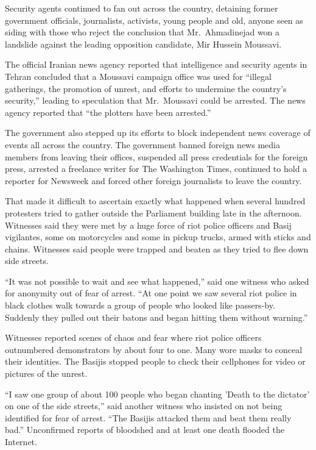 ﻿\documentclass[12pt]{article}
\begin{document}
Security agents continued to fan out across the country, detaining former government officials,
journalists, activists, young people and old, anyone seen as siding with those who reject the
conclusion that Mr.~Ahmadinejad won a landslide against the leading opposition candidate, Mir
Hussein Moussavi.

The official Iranian news agency reported that intelligence and security agents in Tehran concluded
that a Moussavi campaign office was used for ``illegal gatherings, the promotion of unrest, and
efforts to undermine the country's security,'' leading to speculation that Mr.~Moussavi could be
arrested. The news agency reported that ``the plotters have been arrested.''

The government also stepped up its efforts to block independent news coverage of events all across
the country. The government banned foreign news media members from leaving their offices, suspended
all press credentials for the foreign press, arrested a freelance writer for The Washington Times,
continued to hold a reporter for Newsweek and forced other foreign journalists to leave the country.

That made it difficult to ascertain exactly what happened when several hundred protesters tried to
gather outside the Parliament building late in the afternoon. Witnesses said they were met by a huge
force of riot police officers and Basij vigilantes, some on motorcycles and some in pickup trucks,
armed with sticks and chains. Witnesses said people were trapped and beaten as they tried to flee
down side streets.

``It was not possible to wait and see what happened,'' said one witness who asked for anonymity out
of fear of arrest. ``At one point we saw several riot police in black clothes walk towards a group
of people who looked like passers-by. Suddenly they pulled out their batons and began hitting them
without warning.''

Witnesses reported scenes of chaos and fear where riot police officers outnumbered demonstrators by
about four to one. Many wore masks to conceal their identities. The Basijis stopped people to check
their cellphones for video or pictures of the unrest.

``I saw one group of about 100 people who began chanting 'Death to the dictator' on one of the side
streets,'' said another witness who insisted on not being identified for fear of arrest. ``The
Basijis attacked them and beat them really bad.'' Unconfirmed reports of bloodshed and at least one
death flooded the Internet.
\end{document}

